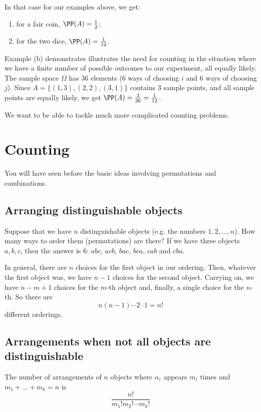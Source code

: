 In that case for our examples above, we get:
\begin{enumerate}[label=(\alph*)]
\item for a fair coin, $\PP(A)=\frac{1}{2}$;
\item for the two dice, $\PP(A)=\frac{1}{12}$.
\end{enumerate}

Example (b) demonstrates illustrates the need for counting in the situation where we have a finite number of possible outcomes to our experiment, all equally likely. The sample space $\Omega$ has $36$ elements ($6$ ways of choosing $i$ and $6$ ways of choosing $j$). Since $A=\{(1,3),(2,2),(3,1)\}$ contains $3$ sample points, and all sample points are equally likely, we get $\PP(A)=\frac{3}{36}=\frac{1}{12}$.

We want to be able to tackle much more complicated counting problems.

\section{Counting}
You will have seen before the basic ideas involving permutations and combinations.

\subsection{Arranging distinguishable objects}
Suppose that we have $n$ distinguishable objects (e.g. the numbers $1,2,\dots,n$). How many ways to order them (permutations) are there? If we have three objects $a,b,c$, then the answer is $6$: $abc$, $acb$, $bac$, $bca$, $cab$ and $cba$.

In general, there are $n$ choices for the first object in our ordering. Then, whatever the first object was, we have $n-1$ choices for the second object. Carrying on, we have $n-m+1$ choices for the $m$-th object and, finally, a single choice for the $n$-th. So there are
\[ n(n-1)\cdots2\cdot1=n! \]
different orderings.

\subsection{Arrangements when not all objects are distinguishable}
The number of arrangements of $n$ objects where $\alpha_i$ appears $m_i$ times and $m_1 + \dots + m_k = n$ is
\begin{equation}
\frac{n!}{m_1!m_2!\cdots m_k!}
\end{equation}

